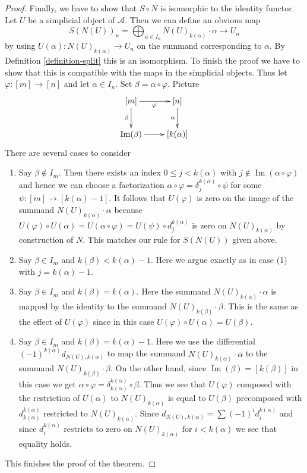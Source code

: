 \documentclass{amsart}
\theoremstyle{plain}
\theoremstyle{definition}
\theoremstyle{remark}
\numberwithin{equation}{subsection}
\def\Im{\mathop{\mathrm{Im}}}
\begin{document}
\begin{proof}
\medskip\noindent
Finally, we have to show that $S \circ N$ is isomorphic to the
identity functor. Let $U$ be a simplicial object of $\mathcal{A}$.
Then we can define an obvious map
$$
S(N(U))_n = \bigoplus\nolimits_{\alpha \in I_n} N(U)_{k(\alpha)} \cdot \alpha
\longrightarrow
U_n
$$
by using $U(\alpha) : N(U)_{k(\alpha)} \to U_n$ on the summand corresponding
to $\alpha$. By Definition \ref{definition-split} this is an isomorphism.
To finish the proof we have to show that this is compatible with
the maps in the simplicial objects. Thus let $\varphi : [m] \to [n]$
and let $\alpha \in I_n$. Set $\beta = \alpha \circ \varphi$.
Picture
$$
\xymatrix{
[m] \ar[r]_\varphi \ar[d]_\beta &
[n] \ar[d]_\alpha \\
\Im(\beta) \ar[r] &
[k(\alpha)]
}
$$
There are several cases to consider
\begin{enumerate}
\item Say $\beta \not \in I_m$. Then there exists an index
$0 \leq j < k(\alpha)$ with $j \not \in \Im(\alpha \circ \varphi)$
and hence we can choose a factorization
$\alpha \circ \varphi = \delta^{k(\alpha)}_j \circ \psi$
for some $\psi : [m] \to [k(\alpha) - 1]$.
It follows that $U(\varphi)$ is zero on the image of the summand
$N(U)_{k(\alpha)} \cdot \alpha$ because $U(\varphi) \circ U(\alpha) =
U(\alpha \circ \varphi) = U(\psi) \circ d^{k(\alpha)}_j$
is zero on $N(U)_{k(\alpha)}$ by construction of $N$.
This matches our rule for $S(N(U))$ given above.
\item Say $\beta \in I_m$ and $k(\beta) < k(\alpha) - 1$. Here we
argue exactly as in case (1) with $j = k(\alpha) - 1$.
\item Say $\beta \in I_m$ and $k(\beta) = k(\alpha)$. Here
the summand $N(U)_{k(\alpha)} \cdot \alpha$ is mapped by the
identity to the summand $N(U)_{k(\beta)} \cdot \beta$.
This is the same as the effect of $U(\varphi)$ since in
this case $U(\varphi) \circ U(\alpha) = U(\beta)$.
\item Say $\beta \in I_m$ and $k(\beta) = k(\alpha) - 1$.
Here we use the differential $(-1)^{k(\alpha)} d_{N(U), k(\alpha)}$
to map the summand $N(U)_{k(\alpha)} \cdot \alpha$
to the summand $N(U)_{k(\beta)} \cdot \beta$.
On the other hand, since $\Im(\beta) = [k(\beta)]$ in this case
we get $\alpha \circ \varphi = \delta^{k(\alpha)}_{k(\alpha)} \circ \beta$.
Thus we see that $U(\varphi)$ composed with the restriction of
$U(\alpha)$ to $N(U)_{k(\alpha)}$ is equal to
$U(\beta)$ precomposed with $d^{k(\alpha)}_{k(\alpha)}$ restricted to
$N(U)_{k(\alpha)}$.
Since $d_{N(U), k(\alpha)} = \sum (-1)^i d^{k(\alpha)}_i$
and since $d^{k(\alpha)}_i$ restricts to zero on
$N(U)_{k(\alpha)}$ for $i < k(\alpha)$
we see that equality holds.
\end{enumerate}
This finishes the proof of the theorem.
\end{proof}
\end{document}

